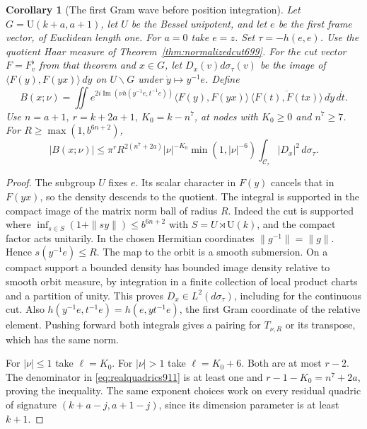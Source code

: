 \documentclass[a4paper,11pt]{article}
\newtheorem{corollary}[proposition]{Corollary}
\theoremstyle{definition}
\theoremstyle{remark}
\numberwithin{equation}{section}
\begin{document}
\begin{corollary}[The first Gram wave before position integration]
\leavevmode\label{cor:realgramposition911}
Let \(G=\mathrm U(k+a,a+1)\), let \(U\) be the Bessel
unipotent, and let \(e\) be the first frame vector, of
Euclidean length one. For \(a=0\) take \(e=z\). Set
\(\tau=-h(e,e)\). Use the quotient Haar measure of
Theorem~\ref{thm:normalizedcut699}. For the cut vector
\(F=F_v^\flat\) from that theorem and \(x\in G\), let
\(D_x(v)d\sigma_\tau(v)\) be the image of
\(\langle F(y),F(yx)\rangle\,d\dot y\) on \(U\backslash G\)
under \(\dot y\mapsto y^{-1}e\). Define
\[
 B(x;\nu)=\iint e^{2i\operatorname{Im}(\nu h(y^{-1}e,t^{-1}e))}
   \langle F(y),F(yx)\rangle\,
   \overline{\langle F(t),F(tx)\rangle}\,d\dot y\,d\dot t .
\]
Use \(n=a+1,\ r=k+2a+1,\ K_0=k-n^7\), at nodes with \(K_0\ge0\)
and \(n^7\ge7\). For \(R\ge\max(1,b^{6n+2})\),
\begin{equation}
 |B(x;\nu)|\le\pi^r R^{2(n^7+2a)}
       |\nu|^{-K_0}\min(1,|\nu|^{-6})
       \int_{\mathcal C_\tau}|D_x|^2\,d\sigma_\tau .
 \label{eq:realgramposition911}
\end{equation}
\end{corollary}
\begin{proof}
The subgroup \(U\) fixes \(e\). Its scalar character in
\(F(y)\) cancels that in \(F(yx)\), so the density descends
to the quotient. The integral is supported in the compact
image of the matrix norm ball of radius \(R\). Indeed the cut
is supported where \(\inf_{s\in S}(1+\|sy\|)\le b^{6n+2}\)
with \(S=U\rtimes\mathrm U(k)\), and the compact factor acts
unitarily. In the chosen Hermitian coordinates
\(\|g^{-1}\|=\|g\|\). Hence \(s(y^{-1}e)\le R\).
The map to the orbit is a smooth submersion. On a compact
support a bounded density has bounded image density relative
to smooth orbit measure, by integration in a finite collection
of local product charts and a partition of unity. This proves
\(D_x\in L^2(d\sigma_\tau)\), including for the continuous
cut. Also \(h(y^{-1}e,t^{-1}e)=h(e,yt^{-1}e)\), the first
Gram coordinate of the relative element. Pushing forward
both integrals gives a pairing for \(T_{\nu,R}\) or its
transpose, which has the same norm.

For \(|\nu|\le1\) take \(\ell=K_0\). For \(|\nu|>1\) take
\(\ell=K_0+6\). Both are at most \(r-2\). The denominator
in \eqref{eq:realquadrics911} is at least one and
\(r-1-K_0=n^7+2a\), proving the inequality. The same exponent
choices work on every residual quadric of signature
\((k+a-j,a+1-j)\), since its dimension parameter is at least
\(k+1\).
\end{proof}
\end{document}
